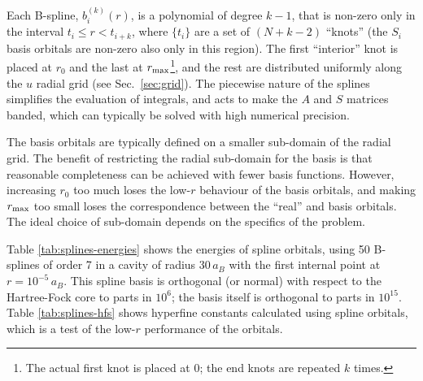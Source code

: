 \documentclass[10pt,twocolumn,a4paper]{article}%
\begin{document}
Each B-spline, $b_i^{(k)}(r)$, is a polynomial of degree $k-1$, that is non-zero only in the interval $t_i\leq r<t_{i+k}$, where $\{t_i\}$ are a set of $(N+k-2)$ ``knots'' (the $S_i$ basis orbitals are non-zero also only in this region).
The first ``interior'' knot is placed at $r_0$ and the last at $r_{\rm max}$\footnote{The actual first knot is placed at 0; the end knots are repeated $k$ times.}, and the rest are distributed uniformly along the $u$ radial grid (see Sec.~\ref{sec:grid}).
The piecewise nature of the splines simplifies the evaluation of integrals, and acts to make the $A$ and $S$ matrices banded, which can typically be solved with high numerical precision.


The basis orbitals are typically defined on a smaller sub-domain of the radial grid.
The benefit of restricting the radial sub-domain for the basis is that reasonable completeness can be achieved with fewer basis functions.
However, increasing $r_0$ too much loses the low-$r$ behaviour of the basis orbitals, and making $r_{\rm max}$ too small loses the correspondence between the ``real'' and basis orbitals.
The ideal choice of sub-domain depends on the specifics of the problem.



Table \ref{tab:splines-energies} shows the energies of spline orbitals, using 50 B-splines of order 7 in a cavity of radius 30\,$a_B$ with the first internal point at $r=10^{-5}\,a_B$.
This spline basis is orthogonal (or normal) with respect to the Hartree-Fock core to parts in $10^6$; the basis itself is orthogonal to parts in $10^{15}$.
Table \ref{tab:splines-hfs} shows hyperfine constants calculated using spline orbitals, which is a test of the low-$r$ performance of the orbitals.
\end{document}
